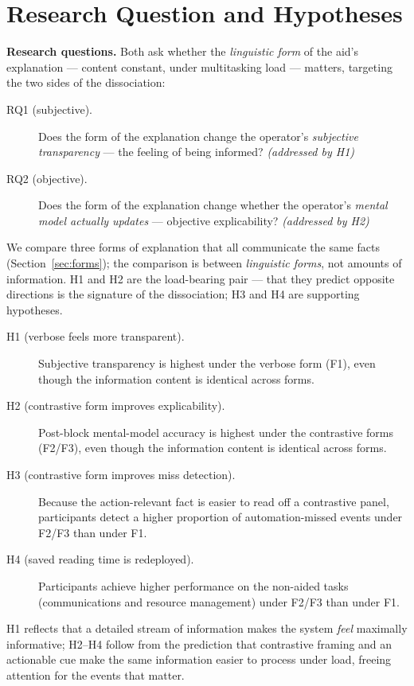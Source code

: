 \documentclass[10pt,twocolumn]{article}
\begin{document}
\section{Research Question and Hypotheses}

\textbf{Research questions.} Both ask whether the \textit{linguistic form} of the aid's explanation --- content constant, under multitasking load --- matters, targeting the two sides of the dissociation:

\begin{description}
  \item[RQ1 (subjective).] Does the form of the explanation change the operator's \textit{subjective transparency} --- the feeling of being informed? \textit{(addressed by H1)}
  \item[RQ2 (objective).] Does the form of the explanation change whether the operator's \textit{mental model actually updates} --- objective explicability? \textit{(addressed by H2)}
\end{description}

We compare three forms of explanation that all communicate the same facts (Section~\ref{sec:forms}); the comparison is between \textit{linguistic forms}, not amounts of information. H1 and H2 are the load-bearing pair --- that they predict opposite directions is the signature of the dissociation; H3 and H4 are supporting hypotheses.

\begin{description}
  \item[H1 (verbose feels more transparent).] Subjective transparency is highest under the verbose form (F1), even though the information content is identical across forms.
  \item[H2 (contrastive form improves explicability).] Post-block mental-model accuracy is highest under the contrastive forms (F2/F3), even though the information content is identical across forms.
  \item[H3 (contrastive form improves miss detection).] Because the action-relevant fact is easier to read off a contrastive panel, participants detect a higher proportion of automation-missed events under F2/F3 than under F1.
  \item[H4 (saved reading time is redeployed).] Participants achieve higher performance on the non-aided tasks (communications and resource management) under F2/F3 than under F1.
\end{description}

H1 reflects that a detailed stream of information makes the system \textit{feel} maximally informative; H2--H4 follow from the prediction that contrastive framing and an actionable cue make the same information easier to process under load, freeing attention for the events that matter.
\end{document}
